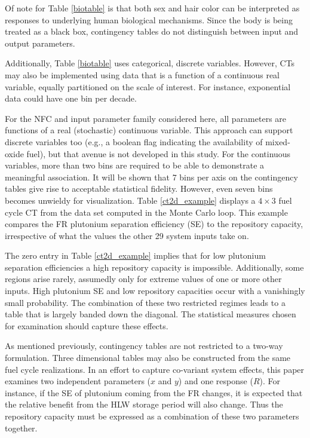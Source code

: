 \documentclass[a4paper, 12pt]{article}
\begin{document}
Of note for Table \ref{biotable} is that both sex and hair color can be interpreted as responses to 
underlying human biological mechanisms.  Since the body is being treated as a black box, contingency 
tables do not distinguish between input and output parameters.

Additionally, Table \ref{biotable} uses categorical, discrete variables.  However, CTs may also be implemented using
data that is a function of a continuous real variable, equally partitioned on the scale of
interest. For instance, exponential data could have one bin per decade.

For the NFC and input parameter family considered here, all parameters are functions of a real 
(stochastic) continuous variable.  This approach can support discrete variables too (e.g., a 
boolean flag indicating the availability of mixed-oxide fuel), but that avenue is not developed 
in this study. For the continuous variables, more than two bins are required to
be able to demonstrate a meaningful association.  It will be shown that 7 bins per axis on the contingency 
tables give rise to acceptable statistical fidelity.  However, even seven bins becomes unwieldy for visualization.
Table \ref{ct2d_example} displays a $4\times 3$ fuel cycle CT from the data set computed in
the Monte Carlo loop.   This example compares the FR plutonium separation efficiency (SE) to the 
repository capacity, irrespective of what the values the other 29 system inputs take on.



The zero entry in Table \ref{ct2d_example} implies that for low plutonium separation efficiencies a 
high repository capacity is impossible.  Additionally, some regions arise rarely, assumedly only for 
extreme values of one or more other inputs. High plutonium SE and low repository capacities occur with 
a vanishingly small probability.  The combination of these two restricted regimes leads to a table that 
is largely banded down the diagonal. The statistical measures chosen for examination should capture these 
effects.

As mentioned previously, contingency tables are not restricted to a two-way formulation.  
Three dimensional tables may also be constructed from the same
fuel cycle realizations.  In an effort to capture co-variant system effects, this paper 
examines two independent parameters ($x$ and $y$) and one response ($R$).  For instance, 
if the SE of plutonium coming from the FR changes, it is expected that the relative benefit 
from the HLW storage period will also change.
Thus the repository capacity must be expressed as a combination of these two parameters together.
\end{document}
